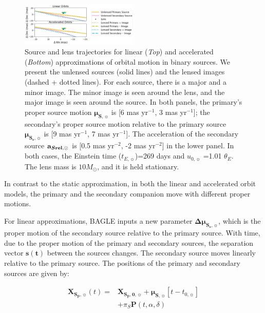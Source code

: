 \documentclass[twocolumn]{aastex701}
\newcommand{\vect}[1]{\boldsymbol{#1}}
\newcommand{\accSsec}{\bold{a}_{\boldsymbol{S\mathrm{rel}},\sun}}
\newcommand{\tnot}{t_{0,\sun}}
\newcommand{\tE}{t_{E,\sun}}
\newcommand{\thetaE}{\theta_E}
\newcommand{\uo}{u_{0,\sun}}
\newcommand{\musvec}{\vect{\mu}_{\boldsymbol{S},\sun}}
\newcommand{\mussvec}{\vect{\mu}_{\boldsymbol{S_s},\sun}}
\newcommand{\deltamussvec}{\vect{\Delta\mu}_{\boldsymbol{S_s},\sun}}
\newcommand{\Xspovec}{\vect{X}_{\boldsymbol{S_p,0},\sun}}
\newcommand{\Xspvec}{\vect{X}_{\boldsymbol{S_p},\sun}}
\begin{document}
\begin{figure}
    \centering
    \includegraphics[width=0.5\textwidth]{figures/linorbs.png}
    \caption{Source and lens trajectories for linear (\emph{Top}) and accelerated (\emph{Bottom}) approximations of orbital motion in binary sources. We present the unlensed sources (solid lines) and the lensed images (dashed + dotted lines). For each source, there is a major and a minor image. The minor image is seen around the lens, and the major image is seen around the source. In both panels, the primary's proper source motion $\musvec$ is [6 mas yr$^{-1}$, 3 mas yr$^{-1}$]; the secondary's proper source motion relative to the primary source $\mussvec$ is [9 mas yr$^{-1}$, 7 mas yr$^{-1}$]. The acceleration of the secondary source $\accSsec$ is [0.5  mas yr$^{-2}$, -2  mas yr$^{-2}$] in the lower panel. In both cases, the Einstein time ($\tE$)=269 days and $\uo$ =1.01 $\thetaE$. The lens mass is $10 M_\odot$, and it is held stationary.}
    
    \label{fig:bspl_linacc}
\end{figure}

In contrast to the static approximation, in both the linear and accelerated orbit models, the primary and the secondary companion move with different proper motions. 

For linear approximations, BAGLE inputs a new parameter $\deltamussvec$, which is the proper motion of the secondary source relative to the primary source. With time, due to the proper motion of the primary and secondary sources, the separation vector $\vect{s(t)}$ between the sources changes. The secondary source moves linearly relative to the primary source. The positions of the primary and secondary sources are given by:

\begin{align}
    \Xspvec (t) = & \Xspovec + \musvec [t - \tnot] \nonumber \\
    &+\pi_S \vect{P}(t, \alpha, \delta)  
    \label{linear_motion}    
\end{align}
\end{document}
